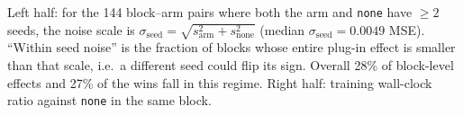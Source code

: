 \begin{table}[t]
\centering
\caption{Plug-in effects against seed noise and against their compute cost.}\label{tab:seed-cost}
\vspace{3pt}\parbox{\linewidth}{\footnotesize Left half: for the 144 block--arm pairs where both the arm and \texttt{none} have $\geq 2$ seeds, the noise scale is $\sigma_{\text{seed}}=\sqrt{s^2_{\text{arm}}+s^2_{\text{none}}}$ (median $\sigma_{\text{seed}}=0.0049$ MSE). ``Within seed noise'' is the fraction of blocks whose entire plug-in effect is smaller than that scale, i.e.\ a different seed could flip its sign. Overall 28\% of block-level effects and 27\% of the wins fall in this regime. Right half: training wall-clock ratio against \texttt{none} in the same block.}
\end{table}
